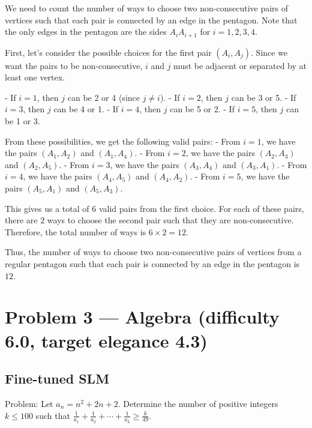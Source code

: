 \documentclass[11pt]{article}
\begin{document}
We need to count the number of ways to choose two non-consecutive pairs of vertices such that each pair is connected by an edge in the pentagon. Note that the only edges in the pentagon are the sides \(A_iA_{i+1}\) for \(i = 1, 2, 3, 4\).

First, let's consider the possible choices for the first pair \((A_i, A_j)\). Since we want the pairs to be non-consecutive, \(i\) and \(j\) must be adjacent or separated by at least one vertex. 

- If \(i = 1\), then \(j\) can be 2 or 4 (since \(j \neq i\)).
- If \(i = 2\), then \(j\) can be 3 or 5.
- If \(i = 3\), then \(j\) can be 4 or 1.
- If \(i = 4\), then \(j\) can be 5 or 2.
- If \(i = 5\), then \(j\) can be 1 or 3.

From these possibilities, we get the following valid pairs:
- From \(i = 1\), we have the pairs \((A_1, A_2)\) and \((A_1, A_4)\).
- From \(i = 2\), we have the pairs \((A_2, A_3)\) and \((A_2, A_5)\).
- From \(i = 3\), we have the pairs \((A_3, A_4)\) and \((A_3, A_1)\).
- From \(i = 4\), we have the pairs \((A_4, A_5)\) and \((A_4, A_2)\).
- From \(i = 5\), we have the pairs \((A_5, A_1)\) and \((A_5, A_3)\).

This gives us a total of \(6\) valid pairs from the first choice.
For each of these pairs, there are \(2\) ways to choose the second pair such that they are non-consecutive. Therefore, the total number of ways is \(6 \times 2 = 12\).

Thus, the number of ways to choose two non-consecutive pairs of vertices from a regular pentagon such that each pair is connected by an edge in the pentagon is \(\boxed{12}\).

\section*{Problem 3 --- Algebra (difficulty 6.0, target elegance 4.3)}

\subsection*{Fine-tuned SLM}

Problem:
Let $a_{n}=n^{2}+2 n+2$. Determine the number of positive integers $k\leq 100$ such that $\frac{1}{a_{1}}+\frac{1}{a_{2}}+\cdots+\frac{1}{a_{k}} \geq \frac{k}{49}$.
\end{document}
